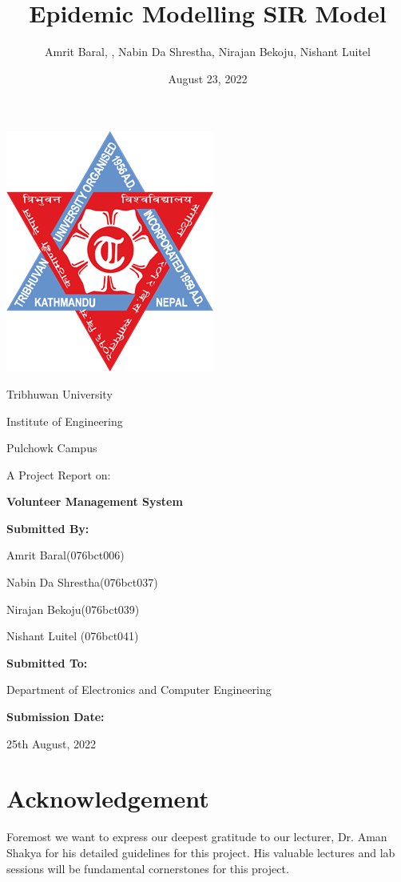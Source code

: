 \documentclass[12pt]{article}
\title{Epidemic Modelling SIR Model}
\author{Amrit Baral, , Nabin Da Shrestha, Nirajan Bekoju, Nishant Luitel}
\date{August 23, 2022}
\begin{document}
  

\bigskip
\bigskip
\bigskip
\bigskip

\begin{center}
\includegraphics[scale = 0.5]{logo.png}

Tribhuwan University

Institute of Engineering

Pulchowk Campus

\bigskip
\bigskip
\bigskip
\bigskip

\noindent\makebox[\linewidth]
{\rule{15cm}{0.4pt}}
A Project Report on:

\textbf{\large Volunteer Management System}
\noindent\makebox[\linewidth]
{\rule{15cm}{0.4pt}}

\bigskip
\bigskip
\bigskip
\bigskip
\textbf{Submitted By:}

Amrit Baral(076bct006)

Nabin Da Shrestha(076bct037)

Nirajan Bekoju(076bct039)

Nishant Luitel (076bct041)

\bigskip
\bigskip
\bigskip
\bigskip
\textbf{Submitted To:}

Department of Electronics and Computer Engineering

\bigskip
\bigskip
\bigskip
\bigskip
\textbf{Submission Date:} 

25th August, 2022

\end{center}



\clearpage

\section{Acknowledgement}
Foremost we want to express our deepest gratitude to our lecturer, Dr. Aman Shakya
for his detailed guidelines for this project. His valuable lectures and lab sessions will be
fundamental cornerstones for this project.
\end{document}
